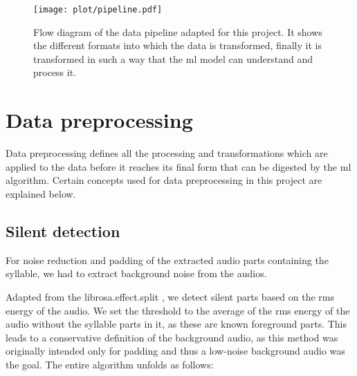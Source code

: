 \begin{figure}[H]
\centering
  \texttt{[image: plot/pipeline.pdf]}
  \caption{Flow diagram of the data pipeline adapted for this project. It shows the different formats into which the data is transformed, finally it is transformed in such a way that the \gls{ml} model can understand and process it.}
  \label{fig:pipeline}
\end{figure}

\section{Data preprocessing}
Data preprocessing defines all the processing and transformations which are applied to the data before it reaches its final form that can be digested by the \gls{ml} algorithm.
Certain concepts used for data preprocessing in this project are explained below.

\subsection{Silent detection}\label{sec:silent_detection}
For noise reduction and padding of the extracted audio parts containing the syllable, we had to extract background noise from the audios.

Adapted from the librosa.effect.split \cite{McFee2020Librosa.effects.splitDocumentation}, we detect silent parts based on the \gls{rms} energy of the audio. We set the threshold to the average of the \gls{rms} energy of the audio without the syllable parts in it, as these are known foreground parts.
This leads to a conservative definition of the background audio, as this method was originally intended only for padding and thus a low-noise background audio was the goal.
The entire algorithm unfolds as follows:

